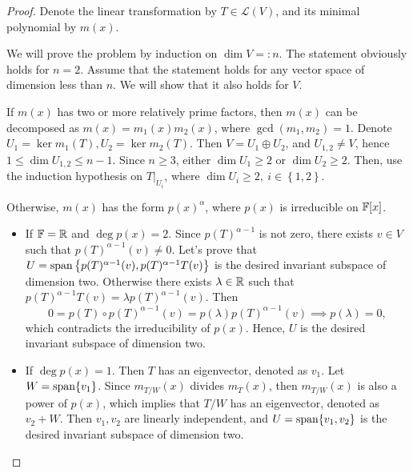 \documentclass{article}
\begin{document}
\begin{proof}
  Denote the linear transformation by \( T\in \mathcal{L}(V) \), and its minimal polynomial by \( m(x) \). \par
  We will prove the problem by induction on \( \dim V=:n \). The statement obviously holds for \( n=2 \). Assume that the statement holds for any vector space of dimension less than \( n \). We will show that it also holds for \( V \).\par
  If \( m(x) \) has two or more relatively prime factors, then \( m(x) \) can be decomposed as \( m(x)=m_1(x)m_2(x) \), where \( \gcd(m_1,m_2)=1 \). Denote \( U_1=\ker m_1(T), U_2=\ker m_2(T) \). Then \( V=U_1\oplus U_2 \), and \( U_{1,2}\neq V \), hence \( 1\le\dim U_{1,2}\le n-1 \). Since \( n\ge 3 \), either \( \dim U_1\ge 2 \) or \( \dim U_2\ge 2 \). Then, use the induction hypothesis on \( T|_{U_i} \), where \( \dim U_i\ge 2,\ i\in \left\{ 1,2 \right\} \). \par
  Otherwise, \( m(x) \) has the form \( p(x)^\alpha \), where \( p(x) \) is irreducible on \( \mathbb{F}[x] \).
  \begin{itemize}
    \item If \( \mathbb{F}=\mathbb{R} \) and \( \deg p(x)=2 \). Since \( p(T)^{\alpha-1} \) is not zero, there exists \( v\in V \) such that \( p(T)^{\alpha-1}(v)\neq 0 \). Let's prove that \( U=\operatorname{span}\left\{ p(T)^{\alpha-1}(v),p(T)^{\alpha-1}T(v) \right\} \) is the desired invariant subspace of dimension two. Otherwise there exists \( \lambda\in\mathbb{R} \) such that \( p(T)^{\alpha-1}T(v)=\lambda p(T)^{\alpha-1}(v) \). Then
    \[ 0=p(T)\circ p(T)^{\alpha-1}(v)=p(\lambda)p(T)^{\alpha-1}(v)\implies p(\lambda)=0, \]
    which contradicts the irreducibility of \( p(x) \). Hence, \( U \) is the desired invariant subspace of dimension two.
    \item If \( \deg p(x)=1 \). Then \( T \) has an eigenvector, denoted as \( v_1 \). Let \( W=\operatorname{span} \{v_1\} \). Since \( m_{T/W}(x) \) divides \( m_T(x) \), then \( m_{T/W}(x) \) is also a power of \( p(x) \), which implies that \( T/W \) has an eigenvector, denoted as \( v_2+W \). Then \( v_1,v_2 \) are linearly independent, and \( U=\operatorname{span}\{v_1,v_2\} \) is the desired invariant subspace of dimension two.
  \end{itemize}
\end{proof}
\end{document}
